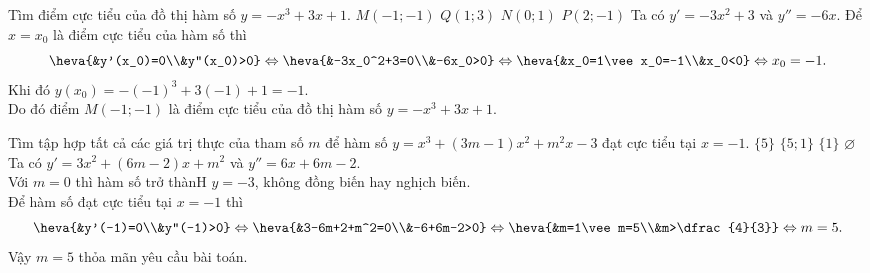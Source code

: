 \begin{ex}%
Tìm điểm cực tiểu của đồ thị hàm số $y=-x^3+3x+1$.
\choice
{\True $M(-1;-1)$}
{$Q(1;3)$}
{$N(0;1)$}
{$P(2;-1)$}
\loigiai
{
Ta có $y'=-3x^2+3$ và $y''=-6x$. Để $x=x_0$ là điểm cực tiểu của hàm số thì
\[\heva{&y'(x_0)=0\\&y''(x_0)>0}\Leftrightarrow\heva{&-3x_0^2+3=0\\&-6x_0>0}\Leftrightarrow\heva{&x_0=1\vee x_0=-1\\&x_0<0}\Leftrightarrow x_0=-1.\]
Khi đó $y(x_0)=-(-1)^3+3(-1)+1=-1$.\\
Do đó điểm $M(-1;-1)$ là điểm cực tiểu của đồ thị hàm số $y=-x^3+3x+1$.
}
\end{ex}
\begin{ex}%
Tìm tập hợp tất cả các giá trị thực của tham số $m$ để hàm số $y=x^3+(3m-1)x^2+m^2x-3$ đạt cực tiểu tại $x=-1$.
\choice
{\True $\{5\}$}
{$\{5;1\}$}
{$\{1\}$}
{$\varnothing$}
\loigiai
{
Ta có $y'=3x^2+(6m-2)x+m^2$ và $y''=6x+6m-2$.\\
Với $m=0$ thì hàm số trở thànH $y=-3$, không đồng biến hay nghịch biến.\\
Để hàm số đạt cực tiểu tại $x=-1$ thì
\[\heva{&y'(-1)=0\\&y''(-1)>0}\Leftrightarrow\heva{&3-6m+2+m^2=0\\&-6+6m-2>0}\Leftrightarrow\heva{&m=1\vee m=5\\&m>\dfrac{4}{3}}\Leftrightarrow m=5.\]
Vậy $m=5$ thỏa mãn yêu cầu bài toán.
}
\end{ex}
